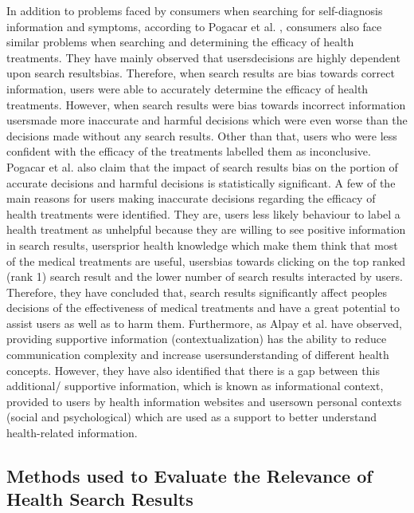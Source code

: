 \documentclass[]{article}
\begin{document}
In addition to problems faced by consumers when searching for self-diagnosis information and symptoms, according to Pogacar et al. \cite{pogacar2017positive}, consumers also face similar problems when searching and determining the efficacy of health treatments. They have mainly observed that users\textquotesingle decisions are highly dependent upon search results\textquotesingle bias. Therefore, when search results are bias towards correct information, users were able to accurately determine the efficacy of health treatments. However, when search results were bias towards incorrect information users\textquotesingle made more inaccurate and harmful decisions which were even worse than the decisions made without any search results. Other than that, users who were less confident with the efficacy of the treatments labelled them as inconclusive. Pogacar et al. \cite{pogacar2017positive} also claim that the impact of search results bias on the portion of accurate decisions and harmful decisions is statistically significant. A few of the main reasons for users making inaccurate decisions regarding the efficacy of health treatments were identified. They are, users less likely behaviour to label a health treatment as unhelpful because they are willing to see positive information in search results, users\textquotesingle prior health knowledge which make them think that most of the medical treatments are useful, users\textquotesingle bias towards clicking on the top ranked (rank 1) search result and the lower number of search results interacted by users. Therefore, they have concluded that, search results significantly affect people\textquotesingle s decisions of the effectiveness of medical treatments and have a great potential to assist users as well as to harm them. Furthermore, as Alpay et al. \cite{alpay2009current} have observed, providing supportive information (contextualization) has the ability to reduce communication complexity and increase users\textquotesingle understanding of different health concepts. However, they have also identified that there is a gap between this additional/ supportive information, which is known as \textquotesingle informational context\textquotesingle, provided to users by health information websites and users\textquotesingle own personal contexts (social and psychological) which are used as a support to better understand health-related information.  

\vspace{0.5cm}

\subsection{Methods used to Evaluate the Relevance of Health Search Results}
\end{document}
